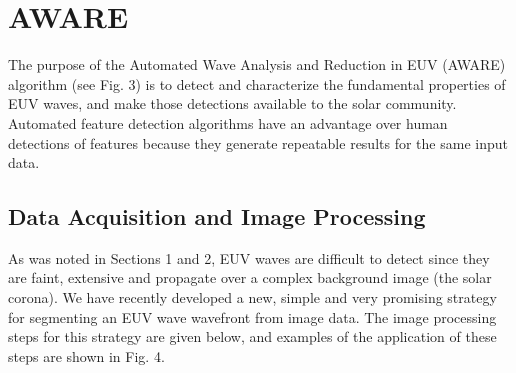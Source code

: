 \section{AWARE}\label{sec:aware}

The purpose of the Automated Wave Analysis and Reduction in EUV (AWARE) algorithm (see Fig. 3) is to detect and characterize the fundamental properties of EUV waves, and make those detections available to the solar community. Automated feature detection algorithms have an advantage over human detections of features because they generate repeatable results for the same input data.


\subsection{Data Acquisition and Image Processing}

As was noted in Sections 1 and 2, EUV waves are difficult to detect since they are faint, extensive and propagate over a complex background image (the solar corona).  We have recently developed a new, simple and very promising strategy for segmenting an EUV wave wavefront from image data.  The image processing steps for this strategy are given below, and examples of the application of these steps are shown in Fig. 4.

